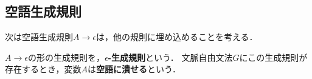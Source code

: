 \subsection{空語生成規則}

\begin{tcolorbox}[colframe=ForestGreen, colback=ForestGreen!10!white, breakable]
    次は空語生成規則$A\to\epsilon$は，他の規則に埋め込めることを考える．
\end{tcolorbox}

\begin{definition}
    $A\to\epsilon$の形の生成規則を，\textbf{$\epsilon$-生成規則}という．
    文脈自由文法$G$にこの生成規則が存在するとき，変数$A$は\textbf{空語に潰せる}という．
\end{definition}

